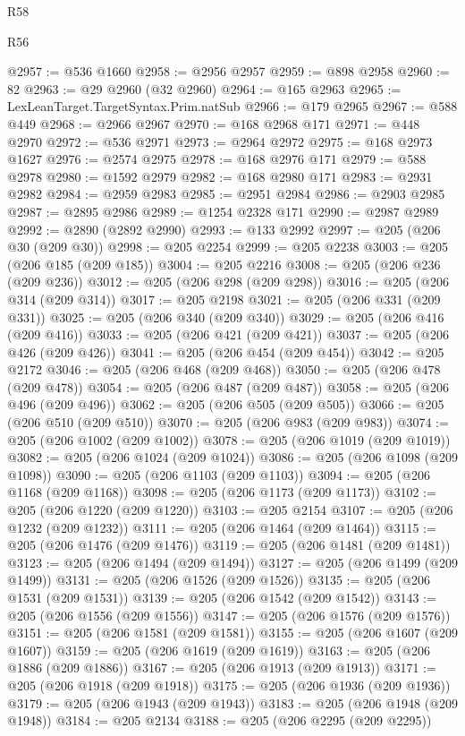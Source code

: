 \begin{lexlean}{R58}
\begin{lexlean}{R56}
\begin{coremodule}
{{{{{{{{{{{{{{{{{{{{{{{{{{{{{{{{{{{{{{{{{{{{{{{{{{{{{{{{{{{{{{{{{{{{{{{{{{{{{{{{{{{{{{{{{{{{{{{{{{{{{{{{{{{{{{{{{{{{{{{{{{{{{{{{{{{{{{{{{{{{{{{{{{{{{{{{{{{{{{{{{{{{{{{{{{{{{{{{{{{{{{{{{{{{{{{{{{{{{{{{{{{{{{{{{{{@2957 := @536 @1660
@2958 := @2956 @2957
@2959 := @898 @2958
@2960 := 82
@2963 := @29 @2960 (@32 @2960)
@2964 := @165 @2963
@2965 := LexLeanTarget.TargetSyntax.Prim.natSub
@2966 := @179 @2965
@2967 := @588 @449
@2968 := @2966 @2967
@2970 := @168 @2968 @171
@2971 := @448 @2970
@2972 := @536 @2971
@2973 := @2964 @2972
@2975 := @168 @2973 @1627
@2976 := @2574 @2975
@2978 := @168 @2976 @171
@2979 := @588 @2978
@2980 := @1592 @2979
@2982 := @168 @2980 @171
@2983 := @2931 @2982
@2984 := @2959 @2983
@2985 := @2951 @2984
@2986 := @2903 @2985
@2987 := @2895 @2986
@2989 := @1254 @2328 @171
@2990 := @2987 @2989
@2992 := @2890 (@2892 @2990)
@2993 := @133 @2992
@2997 := @205 (@206 @30 (@209 @30))
@2998 := @205 @2254
@2999 := @205 @2238
@3003 := @205 (@206 @185 (@209 @185))
@3004 := @205 @2216
@3008 := @205 (@206 @236 (@209 @236))
@3012 := @205 (@206 @298 (@209 @298))
@3016 := @205 (@206 @314 (@209 @314))
@3017 := @205 @2198
@3021 := @205 (@206 @331 (@209 @331))
@3025 := @205 (@206 @340 (@209 @340))
@3029 := @205 (@206 @416 (@209 @416))
@3033 := @205 (@206 @421 (@209 @421))
@3037 := @205 (@206 @426 (@209 @426))
@3041 := @205 (@206 @454 (@209 @454))
@3042 := @205 @2172
@3046 := @205 (@206 @468 (@209 @468))
@3050 := @205 (@206 @478 (@209 @478))
@3054 := @205 (@206 @487 (@209 @487))
@3058 := @205 (@206 @496 (@209 @496))
@3062 := @205 (@206 @505 (@209 @505))
@3066 := @205 (@206 @510 (@209 @510))
@3070 := @205 (@206 @983 (@209 @983))
@3074 := @205 (@206 @1002 (@209 @1002))
@3078 := @205 (@206 @1019 (@209 @1019))
@3082 := @205 (@206 @1024 (@209 @1024))
@3086 := @205 (@206 @1098 (@209 @1098))
@3090 := @205 (@206 @1103 (@209 @1103))
@3094 := @205 (@206 @1168 (@209 @1168))
@3098 := @205 (@206 @1173 (@209 @1173))
@3102 := @205 (@206 @1220 (@209 @1220))
@3103 := @205 @2154
@3107 := @205 (@206 @1232 (@209 @1232))
@3111 := @205 (@206 @1464 (@209 @1464))
@3115 := @205 (@206 @1476 (@209 @1476))
@3119 := @205 (@206 @1481 (@209 @1481))
@3123 := @205 (@206 @1494 (@209 @1494))
@3127 := @205 (@206 @1499 (@209 @1499))
@3131 := @205 (@206 @1526 (@209 @1526))
@3135 := @205 (@206 @1531 (@209 @1531))
@3139 := @205 (@206 @1542 (@209 @1542))
@3143 := @205 (@206 @1556 (@209 @1556))
@3147 := @205 (@206 @1576 (@209 @1576))
@3151 := @205 (@206 @1581 (@209 @1581))
@3155 := @205 (@206 @1607 (@209 @1607))
@3159 := @205 (@206 @1619 (@209 @1619))
@3163 := @205 (@206 @1886 (@209 @1886))
@3167 := @205 (@206 @1913 (@209 @1913))
@3171 := @205 (@206 @1918 (@209 @1918))
@3175 := @205 (@206 @1936 (@209 @1936))
@3179 := @205 (@206 @1943 (@209 @1943))
@3183 := @205 (@206 @1948 (@209 @1948))
@3184 := @205 @2134
@3188 := @205 (@206 @2295 (@209 @2295))
}}}}}}}}}}}}}}}}}}}}}}}}}}}}}}}}}}}}}}}}}}}}}}}}}}}}}}}}}}}}}}}}}}}}}}}}}}}}}}}}}}}}}}}}}}}}}}}}}}}}}}}}}}}}}}}}}}}}}}}}}}}}}}}}}}}}}}}}}}}}}}}}}}}}}}}}}}}}}}}}}}}}}}}}}}}}}}}}}}}}}}}}}}}}}}}}}}}}}}}}}}}}}}}}}}}
\end{coremodule}
\end{lexlean}
\end{lexlean}
